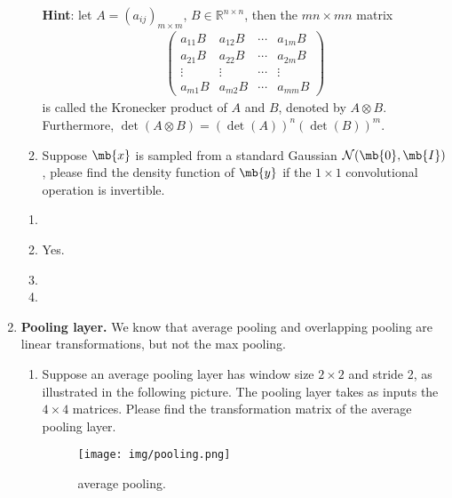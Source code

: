 \begin{exercise}
\begin{enumerate}
\begin{enumerate}
                    \textbf{Hint}: let $A=\left(a_{i j}\right)_{m \times m}$, $B\in\mathbb{R}^{n \times n}$, then the $m n \times m n$ matrix
                    \begin{align*}
                        \left(\begin{array}{cccc}
                                  a_{11} B  & a_{12} B  & \cdots & a_{1 m} B \\
                                  a_{21} B  & a_{22} B  & \cdots & a_{2 m} B \\
                                  \vdots    & \vdots    & \cdots & \vdots    \\
                                  a_{m 1} B & a_{m 2} B & \cdots & a_{m m} B
                              \end{array}\right)
                    \end{align*}
                    is called the Kronecker product of $A$ and $B$, denoted by $ A \otimes B$. Furthermore, $\operatorname{det}(A \otimes B)=(\operatorname{det}(A))^{n}(\operatorname{det}(B))^{m}$.

                \item Suppose $\mb{x}$ is sampled from a standard Gaussian $\mathcal{N}(\mb{0},\mb{I})$, please find the density function of $\mb{y}$ if the $1\times1$ convolutional operation is  invertible.

            \end{enumerate}

            \begin{solution}
                \begin{enumerate}
                    \item []
                    \item Yes.
                    \item
                    \item
                        \qedhere
                \end{enumerate}
            \end{solution}

        \item \textbf{Pooling layer.} We know that average pooling and overlapping pooling are linear transformations, but not the max pooling.
            \begin{enumerate}
                \item Suppose an average pooling layer has window size $2\times2$ and stride 2, as illustrated in the following picture. The pooling layer takes as inputs the $4\times4 $ matrices.  Please find the transformation matrix of the average pooling layer.
                    \begin{figure}[H]
                        \centering
                        \texttt{[image: img/pooling.png]}
                        \caption{average pooling.}
                    \end{figure}


\end{enumerate}
\end{enumerate}
\end{exercise}
